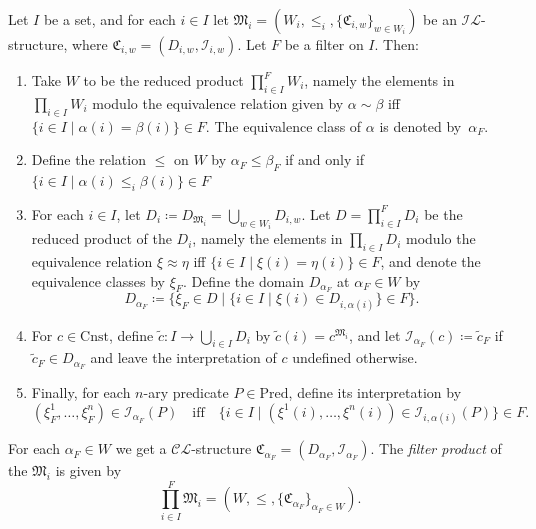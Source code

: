 \documentclass[submission,copyright,creativecommons]{eptcs}
\newcommand{\mo}{\mathfrak}
\renewcommand{\iff}{\quad\text{iff}\quad}
\newcommand{\Con}{\mathrm{Cnst}}
\newcommand{\Pred}{\mathrm{Pred}}
\newcommand{\II}{\mathscr{I}}
\newcommand{\IL}{\mathscr{I\!\!L}}   %
\newcommand{\CL}{\mathscr{C\!\!L}}   %
\begin{document}
\begin{definition}
  Let $I$ be a set, and for each $i \in I$ let
  $\mo{M}_i = (W_i, \leq_i, \{ \mo{C}_{i,w} \}_{w \in W_i})$
  be an $\IL$-structure, where $\mo{C}_{i, w} = (D_{i, w}, \II_{i, w})$.
  Let $F$ be a filter on $I$. Then:
  \begin{enumerate}
    \item Take $W$ to be the reduced product $\prod_{i \in I}^F W_i$, 
          namely the elements in $\prod_{i \in I} W_i$ modulo the equivalence relation
          given by $\alpha \sim \beta$ iff $\{ i \in I \mid \alpha(i) = \beta(i) \} \in F$.
          The equivalence class of $\alpha$ is denoted by~$\alpha_F$.
    \item Define the relation $\leq$ on $W$ by $\alpha_F \leq \beta_F$ if and only if
          $\{ i \in I \mid \alpha(i) \leq_i \beta(i) \} \in F$
    \item For each $i \in I$, let $D_i \coloneq D_{\mo{M}_i} = \bigcup_{w \in W_i} D_{i,w}$.
          Let $D = \prod_{i \in I}^F D_i$ be the reduced product of the $D_i$, namely
          the elements in $\prod_{i \in I} D_i$ modulo the equivalence relation
          $\xi \approx \eta$ iff $\{ i \in I \mid \xi(i) = \eta(i) \} \in F$,
          and denote the equivalence classes by $\xi_F$.
          Define the domain $D_{\alpha_F}$ at $\alpha_F \in W$ by
          \begin{equation*}
            D_{\alpha_F} \coloneq \{ \xi_F \in D \mid \{ i \in I \mid \xi(i) \in D_{i,\alpha(i)} \} \in F \}.
          \end{equation*}
    \item For $c \in \Con$,  define
          $\tilde{c} : I \to \bigcup_{i \in I} D_i$ by $\tilde{c}(i) = c^{\mo{M}_i}$,
          and let $\II_{\alpha_F}(c) \coloneq \tilde{c}_F$ if $\tilde{c}_F \in D_{\alpha_F}$
          and leave the interpretation of $c$ undefined otherwise.
    \item Finally, for each $n$-ary predicate $P \in \Pred$, define its interpretation by
          \begin{equation*}
            (\xi_F^1, \ldots, \xi_F^n) \in \II_{\alpha_F}(P)
              \iff \{ i \in I \mid (\xi^1(i), \ldots, \xi^n(i)) \in \II_{i, \alpha(i)}(P) \} \in F.
        \end{equation*}
  \end{enumerate}
%
  For each $\alpha_F \in W$ we get a $\CL$-structure $\mo{C}_{\alpha_F} = (D_{\alpha_F}, \II_{\alpha_F})$.
  The \emph{filter product} of the $\mo{M}_i$ is given by
  \begin{equation*}
    \prod_{i \in I}^F \mo{M}_i = (W, \leq, \{ \mo{C}_{\alpha_F} \}_{\alpha_F \in W}).
  \end{equation*}
\end{definition}
\end{document}
